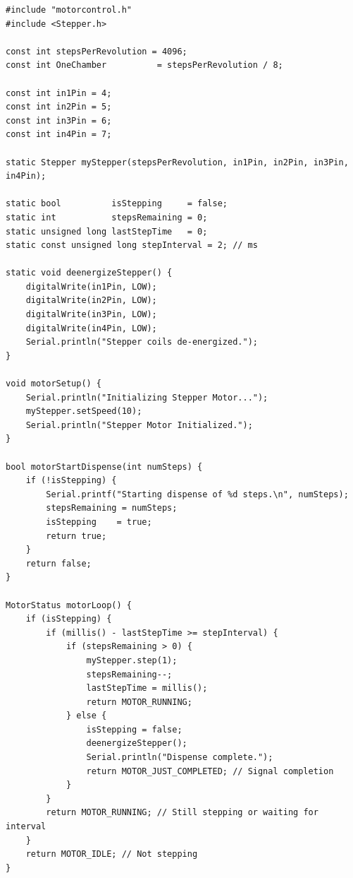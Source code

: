 \begin{lstlisting}[style=cppstyle, caption={Implementation of Motor Control Interface}, label={lst:motorcontrolcpp}]
#include "motorcontrol.h"
#include <Stepper.h>

const int stepsPerRevolution = 4096;
const int OneChamber          = stepsPerRevolution / 8;

const int in1Pin = 4;
const int in2Pin = 5;
const int in3Pin = 6;
const int in4Pin = 7;

static Stepper myStepper(stepsPerRevolution, in1Pin, in2Pin, in3Pin, in4Pin);

static bool          isStepping     = false;
static int           stepsRemaining = 0;
static unsigned long lastStepTime   = 0;
static const unsigned long stepInterval = 2; // ms

static void deenergizeStepper() {
	digitalWrite(in1Pin, LOW);
	digitalWrite(in2Pin, LOW);
	digitalWrite(in3Pin, LOW);
	digitalWrite(in4Pin, LOW);
	Serial.println("Stepper coils de-energized.");
}

void motorSetup() {
	Serial.println("Initializing Stepper Motor...");
	myStepper.setSpeed(10);
	Serial.println("Stepper Motor Initialized.");
}

bool motorStartDispense(int numSteps) {
	if (!isStepping) {
		Serial.printf("Starting dispense of %d steps.\n", numSteps);
		stepsRemaining = numSteps;
		isStepping    = true;
		return true;
	}
	return false;
}

MotorStatus motorLoop() {
	if (isStepping) {
		if (millis() - lastStepTime >= stepInterval) {
			if (stepsRemaining > 0) {
				myStepper.step(1);
				stepsRemaining--;
				lastStepTime = millis();
				return MOTOR_RUNNING;
			} else {
				isStepping = false;
				deenergizeStepper();
				Serial.println("Dispense complete.");
				return MOTOR_JUST_COMPLETED; // Signal completion
			}
		}
		return MOTOR_RUNNING; // Still stepping or waiting for interval
	}
	return MOTOR_IDLE; // Not stepping
}

\end{lstlisting}
